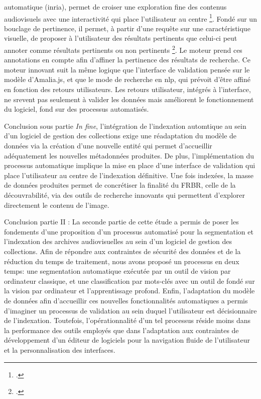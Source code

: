 automatique (\gls{inria}), permet de croiser une exploration fine des contenus audiovisuels avec une interactivité qui place l'utilisateur au centre \footcite{zotero-item-744}. Fondé sur un bouclage de pertinence, il permet, à partir d'une requête sur une caractéristique visuelle, de proposer à l'utilisateur des résultats pertinents que celui-ci peut annoter comme résultats pertinents ou non pertinents \footcite{zotero-item-796}. Le moteur prend ces annotations en compte afin d'affiner la pertinence des résultats de recherche.
Ce moteur innovant suit la même logique que l'interface de validation pensée sur le modèle d'Amalia.js, et que le mode de recherche en \gls{nlp}, qui prévoit d'être affiné en fonction des retours utilisateurs. Les retours utilisateur, intégrés à l'interface, ne srevent pas seulement à valider les données mais améliorent le fonctionnement du logiciel, fond sur des processus automatisés. 

Conclusion sous partie 
\textit{In fine}, l'intégration de l'indexation automtique au sein d'un logiciel de gestion des collections exige une réadaptation du modèle de données via la création d'une nouvelle entité qui permet d'accueillir adéquatement les nouvelles métadonnées produites. De plus, l'implémentation du processus automatique implique la mise en place d'une interface de validation qui place l'utilisateur au centre de l'indexation définitive. Une fois indexées, la masse de données produites permet de concrétiser la finalité du FRBR, celle de la découvrabilité, via des outils de recherche innovants qui permettent d'explorer directement le contenu de l'image. 

Conclusion partie II :
La seconde partie de cette étude a permis de poser les fondements d'une proposition d'un processus automatisé pour la segmentation et l'indexation des archives audiovisuelles au sein d'un logiciel de gestion des collections. Afin de répondre aux contraintes de sécurité des données et de la réduction du temps de traitement, nous avons proposé un processus en deux temps: une segmentation automatique exécutée par un outil de vision par ordinateur classique, et une classification par mots-clés avec un outil de fondé sur la vision par ordinateur et l'apprentissage profond. Enfin, l'adaptation du modèle de données afin d'accueillir ces nouvelles fonctionnalités automatiques a permis d'imaginer un processus de validation au sein duquel l'utilisateur est décisionnaire de l'indexation. 
Toutefois, l'opérationnalité d'un tel processus réside moins dans la performance des outils employés que dans l'adaptation aux contraintes de développement d'un éditeur de logiciels pour la navigation fluide de l'utilisateur et la personnalisation des interfaces. 


















